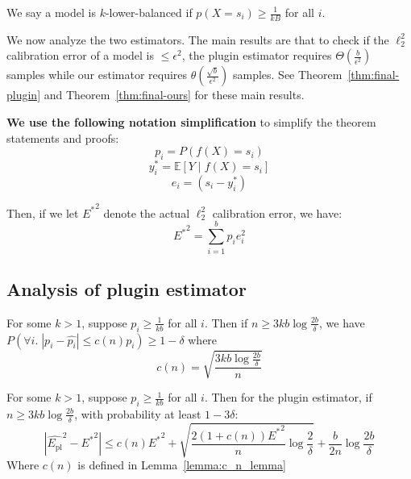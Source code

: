 \begin{definition}
\label{dfn:low-bal}
We say a model is $k$-lower-balanced if $p(X = s_i) \geq \frac{1}{kB}$ for all $i$.
\end{definition}
 
We now analyze the two estimators. The main results are that to check if the $\ell_2^2$ calibration error of a model is $\leq \epsilon^2$, the plugin estimator requires $\Theta(\frac{b}{\epsilon^2})$ samples while our estimator requires $\theta(\frac{\sqrt{b}}{\epsilon^2})$ samples. See Theorem~\ref{thm:final-plugin} and Theorem~\ref{thm:final-ours} for these main results.

\textbf{We use the following notation simplification} to simplify the theorem statements and proofs:
\[ p_i = P(f(X) = s_i) \]
\[ y_i^* = \mathbb{E}[Y \; | \; f(X) = s_i] \]
\[ e_i = (s_i - y_i^*) \]

Then, if we let ${E^*}^2$ denote the actual $\ell_2^2$ calibration error, we have:
\[ {E^*}^2 = \sum_{i=1}^b p_i e_i^2 \]
\subsection{Analysis of plugin estimator}
\begin{lemma}
\label{lemma:c_n_lemma}
For some $k > 1$, suppose $p_i \geq \frac{1}{kb}$ for all $i$. Then if $n \geq 3kb \log{\frac{2b}{\delta}}$, we have $P(\forall i . \; |p_i - \hat{p_i}| \leq c(n) p_i) \geq 1 - \delta$ where
\[ c(n) = \sqrt{\frac{3kb \log{\frac{2b}{\delta}}}{n}} \]
\end{lemma}


\begin{theorem}
\label{thm:plugin-bound}
For some $k > 1$, suppose $p_i \geq \frac{1}{kb}$ for all $i$. Then for the plugin estimator, if $n \geq 3kb \log{\frac{2b}{\delta}}$, with probability at least $1 - 3\delta$:
\[ | \hat{E_{\mbox{pl}}}^2 - {E^*}^2 | \leq c(n){E^*}^2 + \sqrt{\frac{2(1+c(n)){E^*}^2}{n} \log{\frac{2}{\delta}}} + \frac{b}{2n} \log{\frac{2b}{\delta}} \]
Where $c(n)$ is defined in Lemma~\ref{lemma:c_n_lemma}
\end{theorem}

